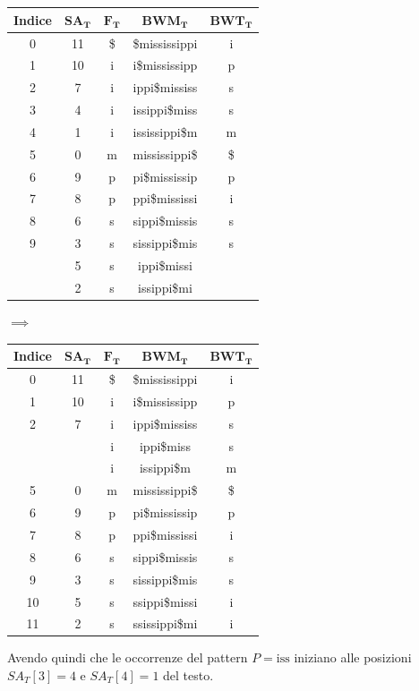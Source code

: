 \begin{esempio}
\begin{table}[H]
\begin{tabular}{c|c|c|c|c}
      \textbf{Indice} & $\mathbf{SA_T}$ & $\mathbf{F_T}$ & $\mathbf{BWM_T}$
      & $\mathbf{BWT_T}$\\ 
      \hline
      0 & 11 & \$ & \$mississippi & i\\
      1 & 10 & i & i\$mississipp & p\\
      2 & 7 & i & ippi\$mississ & s\\
      3 & 4 & i & issippi\$miss & s\\
      4 & 1 & i & ississippi\$m & m\\
      5 & 0 & m & mississippi\$ & \$\\
      6 & 9 & p & pi\$mississip & p\\
      7 & 8 & p & ppi\$mississi & i\\
      8 & 6 & s & sippi\$missis & s\\
      9 & 3 & s & sissippi\$mis & s\\
      {\color{nordred}{10}} & 5 & s & {\color{nordred}{ss}}ippi\$missi
      & {\color{nordgreen}{i}}\\
      {\color{nordred}{11}} & 2 & s & {\color{nordred}{ss}}issippi\$mi
      & {\color{nordgreen}{i}}\\
    \end{tabular}
    $\implies$
    \begin{tabular}{c|c|c|c|c} 
      \textbf{Indice} & $\mathbf{SA_T}$ & $\mathbf{F_T}$ & $\mathbf{BWM_T}$
      & $\mathbf{BWT_T}$\\ 
      \hline
      0 & 11 & \$ & \$mississippi & i\\
      1 & 10 & i & i\$mississipp & p\\
      2 & 7 & i & ippi\$mississ & s\\
      {\color{nordred}{3}} & {\color{nordgreen}{\underline{4}}} & i
                                        & {\color{nordred}{iss}}ippi\$miss & s\\
      {\color{nordred}{4}} & {\color{nordgreen}{\underline{1}}} & i
                                        & {\color{nordred}{iss}}issippi\$m & m\\
      5 & 0 & m & mississippi\$ & \$\\
      6 & 9 & p & pi\$mississip & p\\
      7 & 8 & p & ppi\$mississi & i\\
      8 & 6 & s & sippi\$missis & s\\
      9 & 3 & s & sissippi\$mis & s\\
      10 & 5 & s & ssippi\$missi & i\\
      11 & 2 & s & ssissippi\$mi & i\\
    \end{tabular}
  \end{table}
  Avendo quindi che le occorrenze del pattern $P=\mbox{iss}$ iniziano alle
  posizioni $SA_T[3]=4$ e $SA_T[4]=1$ del testo.
\end{esempio}
